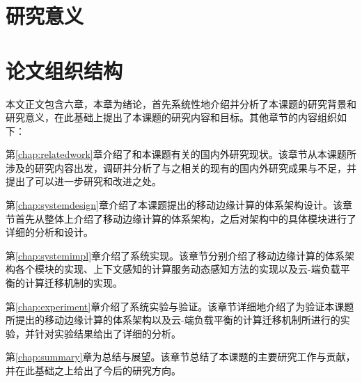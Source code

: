 \section{研究意义}

\section{论文组织结构}
本文正文包含六章，本章为绪论，首先系统性地介绍并分析了本课题的研究背景和研究意义，在此基础上提出了本课题的研究内容和目标。其他章节的内容组织如下：

第\ref{chap:relatedwork}章介绍了和本课题有关的国内外研究现状。该章节从本课题所涉及的研究内容出发，调研并分析了与之相关的现有的国内外研究成果与不足，并提出了可以进一步研究和改进之处。

第\ref{chap:systemdesign}章介绍了本课题提出的移动边缘计算的体系架构设计。该章节首先从整体上介绍了移动边缘计算的体系架构，之后对架构中的具体模块进行了详细的分析和设计。

第\ref{chap:systemimpl}章介绍了系统实现。该章节分别介绍了移动边缘计算的体系架构各个模块的实现、上下文感知的计算服务动态感知方法的实现以及云-端负载平衡的计算迁移机制的实现。

第\ref{chap:experiment}章介绍了系统实验与验证。该章节详细地介绍了为验证本课题所提出的移动边缘计算的体系架构以及云-端负载平衡的计算迁移机制所进行的实验，并针对实验结果给出了详细的分析。

第\ref{chap:summary}章为总结与展望。该章节总结了本课题的主要研究工作与贡献，并在此基础之上给出了今后的研究方向。